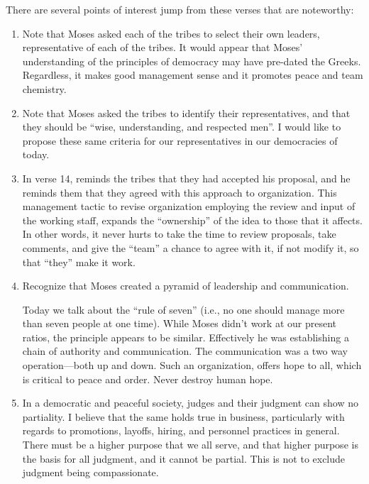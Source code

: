 \documentclass[12pt]{memoir}
\begin{document}
There are several points of interest jump from these verses that are noteworthy: 
\begin{enumerate} 
\item Note that Moses asked each of the tribes to select their own leaders,
representative of each of the tribes. It would appear that Moses'
understanding of the principles of democracy may have pre-dated the
Greeks. Regardless, it makes good management sense and it promotes
peace and team chemistry.

\item Note that Moses asked the tribes to identify their representatives,
and that they should be ``wise, understanding, and respected men''.
I would like to propose these same criteria for our representatives
in our democracies of today. 

\item In  verse 14,  reminds the tribes that they had accepted his proposal,
and he reminds them that they agreed with this approach to organization.
This management tactic to revise organization employing the review
and input of the working staff, expands the ``ownership'' of the
idea to those that it affects. In other words, it never hurts to take
the time to review proposals, take comments, and give the ``team''
a chance to agree with it, if not modify it, so that ``they'' make
it work. 

\item Recognize that Moses created a pyramid of leadership and communication.

Today we talk about the ``rule of seven'' (i.e., no one should manage more than seven people at one time). While Moses didn't work at our present ratios, the principle appears to be similar. Effectively he was establishing a chain of authority and communication.
The communication
was a two way operation---both up and down. Such an organization,
offers hope to all, which is critical to peace and order. Never destroy human hope. 

\item In a democratic and peaceful society, judges and their judgment can
show no partiality. I believe that the same holds true in business,
particularly with regards to promotions, layoffs, hiring, and personnel
practices in general. There must be a higher purpose that we all serve,
and that higher purpose is the basis for all judgment, and it cannot
be partial. This is not to exclude judgment being compassionate. 


\end{enumerate}
\end{document}

